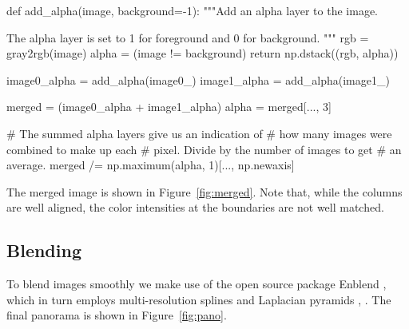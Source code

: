     \begin{pyverbatim}
      def add_alpha(image, background=-1):
          """Add an alpha layer to the image.

          The alpha layer is set to 1 for foreground
          and 0 for background.
          """
          rgb = gray2rgb(image)
          alpha = (image != background)
          return np.dstack((rgb, alpha))

      image0_alpha = add_alpha(image0_)
      image1_alpha = add_alpha(image1_)

      merged = (image0_alpha + image1_alpha)
      alpha = merged[..., 3]

      # The summed alpha layers give us an indication of
      # how many images were combined to make up each
      # pixel.  Divide by the number of images to get
      # an average.
      merged /= np.maximum(alpha, 1)[..., np.newaxis]
    \end{pyverbatim}

    The merged image is shown in Figure~\ref{fig:merged}. Note that, while the columns are well aligned, the color intensities at the boundaries are not well matched.

  

  \subsection{Blending}
    \label{sub:blending}

    To blend images smoothly we make use of the open source package Enblend \citep{Enblend}, which in turn employs multi-resolution splines and Laplacian pyramids \citep{burt_adelson_0}, \citep{burt_adelson_1}. The final panorama is shown in Figure~\ref{fig:pano}.

